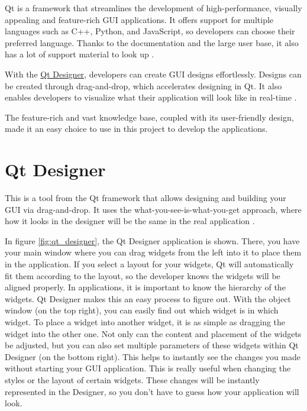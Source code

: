 Qt is a framework that streamlines the development of high-performance, visually appealing and feature-rich GUI applications. It offers support for multiple languages such as C++, Python, and JavaScript, so developers can choose their preferred language. Thanks to the documentation and the large user base, it also has a lot of support material to look up \cite{qt}.

With the \hyperref[sub:qt_designer]{Qt Designer}, developers can create GUI designs effortlessly. Designs can be created through drag-and-drop, which accelerates designing in Qt. It also enables developers to visualize what their application will look like in real-time \cite{qt}.

The feature-rich and vast knowledge base, coupled with its user-friendly design, made it an easy choice to use in this project to develop the applications.


\section{Qt Designer}
\label{sub:qt_designer}

This is a tool from the Qt framework that allows designing and building your GUI via drag-and-drop. It uses the what-you-see-is-what-you-get approach, where how it looks in the designer will be the same in the real application \cite{qt}.

In figure \ref{fig:qt_designer}, the Qt Designer application is shown. There, you have your main window where you can drag widgets from the left into it to place them in the application. If you select a layout for your widgets, Qt will automatically fit them according to the layout, so the developer knows the widgets will be aligned properly. In applications, it is important to know the hierarchy of the widgets. Qt Designer makes this an easy process to figure out. With the object window (on the top right), you can easily find out which widget is in which widget. To place a widget into another widget, it is as simple as dragging the widget into the other one. Not only can the content and placement of the widgets be adjusted, but you can also set multiple parameters of these widgets within Qt Designer (on the bottom right). This helps to instantly see the changes you made without starting your GUI application. This is really useful when changing the styles or the layout of certain widgets. These changes will be instantly represented in the Designer, so you don't have to guess how your application will look.

